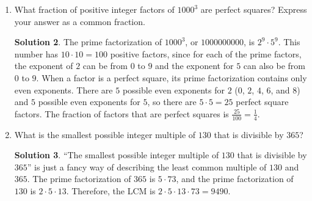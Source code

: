 \documentclass{article}
\theoremstyle{definition}
\newtheorem*{solution}{Solution}
\begin{document}
\begin{multicols}{2}
\begin{enumerate}
\begin{solution}
                It's important that we get rid of the absolute value signs before we replace the numbers with their remainders, because the latter step could change the order of the two numbers.
                If we replaced each number with its remainder first, we would have gotten $\abs{1 \cdot 1 - 1 \cdot 0} = 1$.
                The right side of the subtraction operation is originally greater than the left side, so when calculating the absolute difference we should subtract $7 \cdot 219$ from $4 \cdot 199$ instead of the other way around.
                However, after we replace each number with its remainder, $4 \cdot 199$ which becomes $1 \cdot 1$ is greater than $7 \cdot 219$, leading to a wrong answer.
                We can't replace a number with its remainder when the expression involves absolute value operations.
            \end{solution}
        \item What fraction of positive integer factors of $1000^3$ are perfect squares?
            Express your answer as a common fraction.
            \begin{solution}
                The prime factorization of $1000^3$, or $\num{1000000000}$, is $2^9 \cdot 5^9$.
                This number has $10 \cdot 10 = 100$ positive factors, since for each of the prime factors, the exponent of $2$ can be from $0$ to $9$ and the exponent for $5$ can also be from $0$ to $9$.
                When a factor is a perfect square, its prime factorization contains only even exponents.
                There are $5$ possible even exponents for $2$ ($0$, $2$, $4$, $6$, and $8$) and $5$ possible even exponents for $5$, so there are $5 \cdot 5 = 25$ perfect square factors.
                The fraction of factors that are perfect squares is $\frac{25}{100} = \boxed{\frac{1}{4}}$.
            \end{solution}
        \item What is the smallest possible integer multiple of $130$ that is divisible by $365$?
            \begin{solution}
                ``The smallest possible integer multiple of $130$ that is divisible by $365$'' is just a fancy way of describing the least common multiple of $130$ and $365$.
                The prime factorization of $365$ is $5 \cdot 73$, and the prime factorization of $130$ is $2 \cdot 5 \cdot 13$.
                Therefore, the LCM is $2 \cdot 5 \cdot 13 \cdot 73 = 9490$.
                

\end{solution}
\end{enumerate}
\end{multicols}
\end{document}
